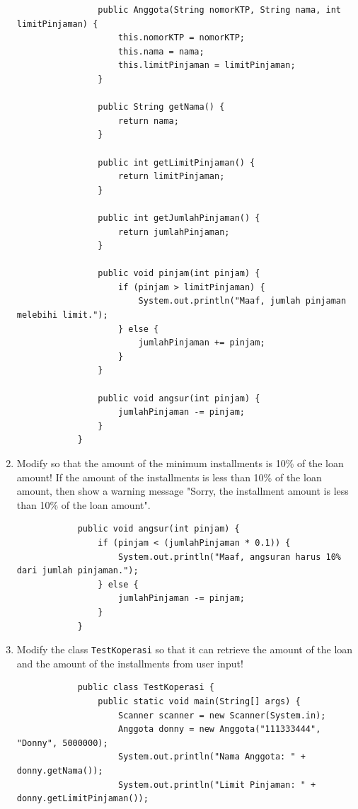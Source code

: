\documentclass[12pt,titlepage]{article}
\begin{document}
\begin{enumerate}
{\begin{verbatim}
                public Anggota(String nomorKTP, String nama, int limitPinjaman) {
                    this.nomorKTP = nomorKTP;
                    this.nama = nama;
                    this.limitPinjaman = limitPinjaman;
                }

                public String getNama() {
                    return nama;
                }

                public int getLimitPinjaman() {
                    return limitPinjaman;
                }

                public int getJumlahPinjaman() {
                    return jumlahPinjaman;
                }

                public void pinjam(int pinjam) {
                    if (pinjam > limitPinjaman) {
                        System.out.println("Maaf, jumlah pinjaman melebihi limit.");
                    } else {
                        jumlahPinjaman += pinjam;
                    }
                }

                public void angsur(int pinjam) {
                    jumlahPinjaman -= pinjam;
                }
            }
        \end{verbatim}
    }
    \item {
        Modify so that the amount of the minimum installments is 10\% of the loan amount!
        If the amount of the installments is less than 10\% of the loan amount, then show
        a warning message "Sorry, the installment amount is less than 10\% of the loan amount".

        \begin{verbatim}
            public void angsur(int pinjam) {
                if (pinjam < (jumlahPinjaman * 0.1)) {
                    System.out.println("Maaf, angsuran harus 10% dari jumlah pinjaman.");
                } else {
                    jumlahPinjaman -= pinjam;
                }
            }
        \end{verbatim}
    }
    \pagebreak
    \item {
        Modify the class \texttt{TestKoperasi} so that it can retrieve the amount of the loan
        and the amount of the installments from user input!

        \begin{verbatim}
            public class TestKoperasi {
                public static void main(String[] args) {
                    Scanner scanner = new Scanner(System.in);
                    Anggota donny = new Anggota("111333444", "Donny", 5000000);
                    System.out.println("Nama Anggota: " + donny.getNama());
                    System.out.println("Limit Pinjaman: " + donny.getLimitPinjaman());


\end{verbatim}}
\end{enumerate}
\end{document}
